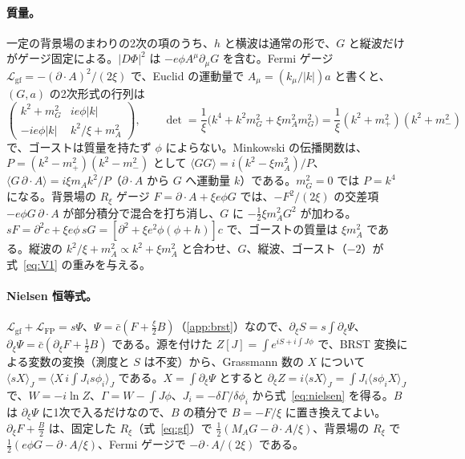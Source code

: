 \documentclass[a4paper,10pt]{ltjsarticle}
\begin{document}
\paragraph{質量。}一定の背景場のまわりの2次の項のうち、$h$ と横波は通常の形で、$G$ と縦波だけがゲージ固定による。$|D\Phi|^2$ は $-e\phi A^\mu\partial_\mu G$ を含む。Fermi ゲージ $\mathcal L_{\mathrm{gf}}=-(\partial\!\cdot\!A)^2/(2\xi)$ で、Euclid の運動量で $A_\mu=(k_\mu/|k|)a$ と書くと、$(G,a)$ の2次形式の行列は
\begin{equation*}
\begin{pmatrix}k^2+m_G^2&ie\phi|k|\\-ie\phi|k|&k^2/\xi+m_A^2\end{pmatrix},\qquad
\det=\frac1\xi\bigl(k^4+k^2m_G^2+\xi m_A^2m_G^2\bigr)=\frac1\xi(k^2+m_+^2)(k^2+m_-^2)
\end{equation*}
で、ゴーストは質量を持たず $\phi$ によらない。Minkowski の伝播関数は、$P=(k^2-m_+^2)(k^2-m_-^2)$ として $\langle GG\rangle=i(k^2-\xi m_A^2)/P$、$\langle G\,\partial\!\cdot\!A\rangle=i\xi m_Ak^2/P$（$\partial\!\cdot\!A$ から $G$ へ運動量 $k$）である。$m_G^2=0$ では $P=k^4$ になる。背景場の $R_\xi$ ゲージ $F=\partial\!\cdot\!A+\xi e\phi G$ では、$-F^2/(2\xi)$ の交差項 $-e\phi G\,\partial\!\cdot\!A$ が部分積分で混合を打ち消し、$G$ に $-\frac12\xi m_A^2G^2$ が加わる。$sF=\partial^2c+\xi e\phi\,sG=[\partial^2+\xi e^2\phi(\phi+h)]c$ で、ゴーストの質量は $\xi m_A^2$ である。縦波の $k^2/\xi+m_A^2\propto k^2+\xi m_A^2$ と合わせ、$G$、縦波、ゴースト（$-2$）が式~\eqref{eq:V1} の重みを与える。

\paragraph{Nielsen 恒等式。}$\mathcal L_{\mathrm{gf}}+\mathcal L_{\mathrm{FP}}=s\Psi$、$\Psi=\bar c(F+\frac\xi2B)$（\ref{app:brst}）なので、$\partial_\xi S=s\int\partial_\xi\Psi$、$\partial_\xi\Psi=\bar c(\partial_\xi F+\frac12B)$ である。源を付けた $Z[J]=\int e^{iS+i\int J\phi}$ で、BRST 変換による変数の変換（測度と $S$ は不変）から、Grassmann 数の $X$ について $\langle sX\rangle_J=\langle X\,i\!\int\!J_is\phi_i\rangle_J$ である。$X=\int\partial_\xi\Psi$ とすると $\partial_\xi Z=i\langle sX\rangle_J=\int J_i\langle s\phi_iX\rangle_J$ で、$W=-i\ln Z$、$\Gamma=W-\int J\phi$、$J_i=-\delta\Gamma/\delta\phi_i$ から式~\eqref{eq:nielsen} を得る。$B$ は $\partial_\xi\Psi$ に1次で入るだけなので、$B$ の積分で $B=-F/\xi$ に置き換えてよい。$\partial_\xi F+\frac B2$ は、固定した $R_\xi$（式~\eqref{eq:gf}）で $\frac12(M_AG-\partial\!\cdot\!A/\xi)$、背景場の $R_\xi$ で $\frac12(e\phi G-\partial\!\cdot\!A/\xi)$、Fermi ゲージで $-\partial\!\cdot\!A/(2\xi)$ である。
\end{document}
